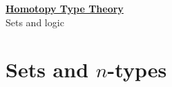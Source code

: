\documentclass[hott-all.tex]{subfiles}
\begin{document}
\begin{center}
  {\Large{\underline{\textbf{Homotopy Type Theory}}}} \\[2mm]
  {\large Sets and logic}
\end{center}

\setcounter{chapter}{3}

%

\section{Sets and \texorpdfstring{$n$}{n}-types}


%
\end{document}
